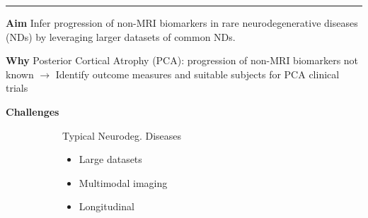 \documentclass[portrait,a0,final,20pt]{a0poster}
\newcommand{\fnt}[1]{\LARGE{#1}}
\begin{document}
\fnt{


\newcommand{\lp}{\lambda_{d_i}^{\psi(k)}}
\newcommand{\lpuu}{\lambda_{d_i}^{\psi(k),(u)}}
\newcommand{\lpum}{\lambda_{d_i}^{\psi(k),(u-1)}}

\newcommand{\cmark}{\ding{51}}%
\newcommand{\xmark}{\ding{55}}%

\newcommand{\yes}{{\LARGE \textcolor{green!50!black}{\cmark} \par}}
\newcommand{\no}{{\LARGE \textcolor{red}{\xmark} \par}}

\hrule

\newcommand{\heading}[1]{\noindent\textbf{\Huge{#1}}}

\begin{multicols}{2}							
\raggedcolumns							%

\pagenumbering{gobble}

\vspace{-3em}

\heading{Aim} Infer progression of non-MRI biomarkers in rare neurodegenerative diseases (NDs) by leveraging larger datasets of common NDs.


\heading{Why} Posterior Cortical Atrophy (PCA): progression of non-MRI biomarkers not known $\rightarrow$ Identify outcome measures and suitable subjects for PCA clinical trials

\columnbreak

\heading{Challenges}





\begin{figure}[H]
\fnt{
\begin{subfigure}{0.48\columnwidth}
  Typical Neurodeg. Diseases
  
  \begin{itemize}
   \item Large datasets \yes
   \item Multimodal imaging \yes
   \item Longitudinal \yes
   

\end{itemize}
\end{subfigure}}
\end{figure}
\end{multicols}}
\end{document}
